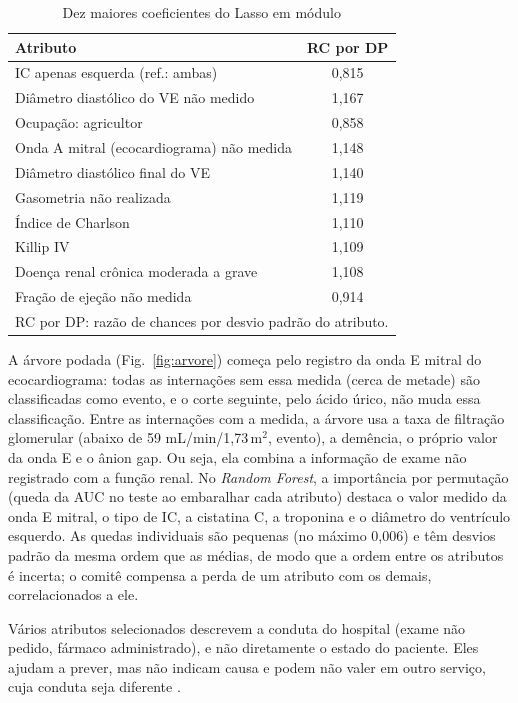 \documentclass[conference]{IEEEtran}
\begin{document}
\begin{table}[htbp]
\caption{Dez maiores coeficientes do Lasso em módulo}
\label{tab:lasso}
\centering
\footnotesize
\begin{tabular}{lc}
\toprule
\textbf{Atributo} & \textbf{RC por DP} \\
\midrule
IC apenas esquerda (ref.: ambas) & 0,815 \\
Diâmetro diastólico do VE não medido & 1,167 \\
Ocupação: agricultor & 0,858 \\
Onda A mitral (ecocardiograma) não medida & 1,148 \\
Diâmetro diastólico final do VE & 1,140 \\
Gasometria não realizada & 1,119 \\
Índice de Charlson & 1,110 \\
Killip IV & 1,109 \\
Doença renal crônica moderada a grave & 1,108 \\
Fração de ejeção não medida & 0,914 \\
\bottomrule
\multicolumn{2}{l}{\scriptsize RC por DP: razão de chances por desvio padrão do atributo.}
\end{tabular}
\end{table}

A árvore podada (Fig.~\ref{fig:arvore}) começa pelo registro da onda E mitral do ecocardiograma: todas as internações sem essa medida (cerca de metade) são classificadas como evento, e o corte seguinte, pelo ácido úrico, não muda essa classificação. Entre as internações com a medida, a árvore usa a taxa de filtração glomerular (abaixo de 59 mL/min/1,73\,m$^2$, evento), a demência, o próprio valor da onda E e o ânion gap. Ou seja, ela combina a informação de exame não registrado com a função renal. No \textit{Random Forest}, a importância por permutação \cite{b14} (queda da AUC no teste ao embaralhar cada atributo) destaca o valor medido da onda E mitral, o tipo de IC, a cistatina C, a troponina e o diâmetro do ventrículo esquerdo. As quedas individuais são pequenas (no máximo 0,006) e têm desvios padrão da mesma ordem que as médias, de modo que a ordem entre os atributos é incerta; o comitê compensa a perda de um atributo com os demais, correlacionados a ele.

Vários atributos selecionados descrevem a conduta do hospital (exame não pedido, fármaco administrado), e não diretamente o estado do paciente. Eles ajudam a prever, mas não indicam causa e podem não valer em outro serviço, cuja conduta seja diferente \cite{b20}.
\end{document}
